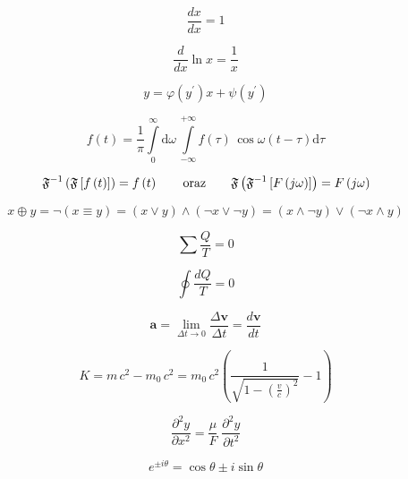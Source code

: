 \begin{equation}
	\frac{dx}{dx} = 1
\end{equation}

\begin{equation}
	\frac{d}{dx} \ln x = \frac{1}{x}
\end{equation}

\begin{equation}
	y = \varphi  (y^\prime)x + \psi(y^\prime)
\end{equation}

\begin{equation}
	f(t) = \frac{1}{\pi} \int\limits_0^\infty \mathrm{d} \omega \,\int\limits_{-\infty}^{+\infty} f(\tau)\, \cos \omega (t-\tau)  \mathrm{d}\tau
\end{equation}

\[
	\mathfrak{F}^{-1}\left(\mathfrak{F} \left[ f\left(t \right ) \right ] \right ) = f \left(t \right )
	\qquad \textup{oraz} \qquad
	\mathfrak{F}\left(\mathfrak{F}^{-1} \left[ F\left(j\omega \right ) \right ] \right ) = F \left(j\omega \right )
\]

\begin{equation*}
	x \oplus y = \neg (x \equiv y) = (x \vee y) \wedge (\neg x \vee \neg y) = (x \wedge \neg y) \vee (\neg x \wedge y)
\end{equation*}

\begin{equation*}
	\sum \frac{Q}{T} = 0
\end{equation*}

\begin{equation}
	\oint \frac{dQ}{T} = 0
\end{equation}

\begin{equation}
	\pmb{a} = \lim\limits_{\Delta t \to 0} \frac{\Delta \pmb{v}}{\Delta t} = \frac{d\pmb{v}}{dt}
\end{equation}

\begin{equation}
	K = m\,c^2 - m_0\,c^2
	= m_0\,c^2 \left(
	\frac{1}{ \sqrt{1 - \left( \frac{v}{c} \right)^2 } } -1
	\right)
\end{equation}

\begin{equation}
	\frac{\partial^2 y}{\partial x^2} = \frac{\mu}{F} \; \frac{\partial^2 y}{\partial t^2}
\end{equation}

\begin{equation}
	e^{\pm i\theta} = \cos \theta \pm i \sin\theta
\end{equation}

